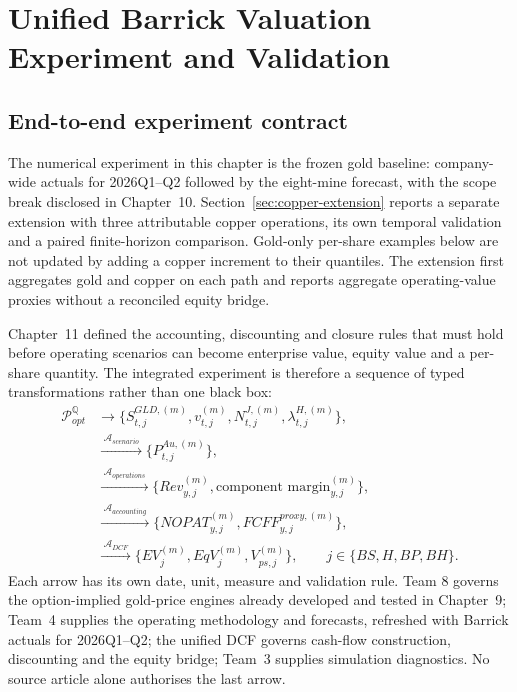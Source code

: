 \chapter{Unified Barrick Valuation Experiment and Validation}

\section{End-to-end experiment contract}

The numerical experiment in this chapter is the frozen gold baseline:
company-wide actuals for 2026Q1--Q2 followed by the eight-mine forecast,
with the scope break disclosed in Chapter~10.
Section~\ref{sec:copper-extension} reports a separate extension
with three attributable copper operations, its own temporal validation
and a paired finite-horizon comparison. Gold-only per-share examples below
are not updated by adding a copper increment to their quantiles. The
extension first aggregates gold and copper on each path and reports
aggregate operating-value proxies without a reconciled equity bridge.

Chapter~11 defined the accounting, discounting and closure rules that must hold
before operating scenarios can become enterprise value, equity value and a
per-share quantity. The integrated experiment is therefore a sequence of typed
transformations rather than one black box:
\begin{align}
\mathcal P_{opt}^{\mathbb Q}
&\longrightarrow
\{S_{t,j}^{GLD,(m)},v_{t,j}^{(m)},N_{t,j}^{J,(m)},
\lambda_{t,j}^{H,(m)}\},\\
&\xrightarrow{\;\mathcal A_{scenario}\;}
\{P_{t,j}^{Au,(m)}\},\\
&\xrightarrow{\;\mathcal A_{operations}\;}
\{Rev_{y,j}^{(m)},\text{component margin}_{y,j}^{(m)}\},\\
&\xrightarrow{\;\mathcal A_{accounting}\;}
\{NOPAT_{y,j}^{(m)},FCFF_{y,j}^{proxy,(m)}\},\\
&\xrightarrow{\;\mathcal A_{DCF}\;}
\{EV_j^{(m)},EqV_j^{(m)},V_{ps,j}^{(m)}\},
\qquad j\in\{BS,H,BP,BH\}.
\end{align}
Each arrow has its own date, unit, measure and validation rule. Team 8 governs
the option-implied gold-price engines already developed and tested in
Chapter~9; Team~4 supplies the operating methodology and forecasts, refreshed
with Barrick actuals for 2026Q1--Q2; the unified DCF governs cash-flow
construction, discounting and the equity bridge; Team~3 supplies simulation
diagnostics. No source article alone authorises the last arrow.

